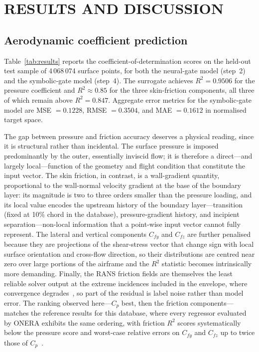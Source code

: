 \documentclass{WCCM-ECCOMAS_2026_Full_Paper}
\begin{document}
\section{RESULTS AND DISCUSSION}
\label{sec:results}

\subsection{Aerodynamic coefficient prediction}

Table~\ref{tab:results} reports the coefficient-of-determination
scores on the held-out test sample of 4\,068\,074 surface points,
for both the neural-gate model (step~2) and the symbolic-gate model
(step~4).  The surrogate achieves $R^{2}=0.9506$ for the pressure
coefficient and $R^{2}\approx 0.85$ for the three skin-friction
components, all three of which remain above $R^{2}=0.847$.
Aggregate error metrics for the symbolic-gate model are MSE
$=0.1228$, RMSE $=0.3504$, and MAE $=0.1612$ in normalised target
space.

The gap between pressure and friction accuracy deserves a physical
reading, since it is structural rather than incidental.  The surface
pressure is imposed predominantly by the outer, essentially inviscid
flow; it is therefore a direct---and largely local---function of the
geometry and flight condition that constitute the input vector.  The
skin friction, in contrast, is a wall-gradient quantity, proportional
to the wall-normal velocity gradient at the base of the boundary
layer: its magnitude is two to three orders smaller than the pressure
loading, and its local value encodes the upstream history of the
boundary layer---transition (fixed at 10\% chord in the database),
pressure-gradient history, and incipient separation---non-local
information that a point-wise input vector cannot fully represent.
The lateral and vertical components $C_{fy}$ and $C_{fz}$ are further
penalised because they are projections of the shear-stress vector
that change sign with local surface orientation and cross-flow
direction, so their distributions are centred near zero over large
portions of the airframe and the $R^{2}$ statistic becomes
intrinsically more demanding.  Finally, the RANS friction fields are
themselves the least reliable solver output at the extreme
incidences included in the envelope, where convergence
degrades~\cite{Peter2025}, so part of the residual is label noise
rather than model error.  The ranking observed here---$C_p$ best,
then the friction components---matches the reference results for
this database, where every regressor evaluated by
ONERA exhibits the same ordering, with friction $R^{2}$ scores
systematically below the pressure score and worst-case relative
errors on $C_{fy}$ and $C_{fz}$ up to twice those of
$C_p$~\cite{Peter2025}.
\end{document}
